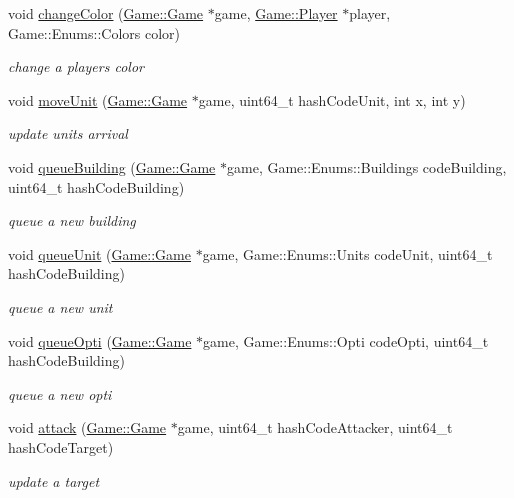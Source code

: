 \begin{DoxyCompactItemize}
void \hyperlink{class_server_side_abb0e2ff64068223f46dd66b323386a9d}{change\+Color} (\hyperlink{class_game_1_1_game}{Game\+::\+Game} $\ast$game, \hyperlink{class_game_1_1_player}{Game\+::\+Player} $\ast$player, Game\+::\+Enums\+::\+Colors color)
\begin{DoxyCompactList}\small\item\em change a player\textquotesingle{}s color \end{DoxyCompactList}\item 
void \hyperlink{class_server_side_a71bd6a7b163c6a8c23233832fd3bbb63}{move\+Unit} (\hyperlink{class_game_1_1_game}{Game\+::\+Game} $\ast$game, uint64\+\_\+t hash\+Code\+Unit, int x, int y)
\begin{DoxyCompactList}\small\item\em update unit\textquotesingle{}s arrival \end{DoxyCompactList}\item 
void \hyperlink{class_server_side_a294f328778629a8e499c5ac87ebbda9f}{queue\+Building} (\hyperlink{class_game_1_1_game}{Game\+::\+Game} $\ast$game, Game\+::\+Enums\+::\+Buildings code\+Building, uint64\+\_\+t hash\+Code\+Building)
\begin{DoxyCompactList}\small\item\em queue a new building \end{DoxyCompactList}\item 
void \hyperlink{class_server_side_ac24547f0638dc01d70dd2bd5ae4eb12c}{queue\+Unit} (\hyperlink{class_game_1_1_game}{Game\+::\+Game} $\ast$game, Game\+::\+Enums\+::\+Units code\+Unit, uint64\+\_\+t hash\+Code\+Building)
\begin{DoxyCompactList}\small\item\em queue a new unit \end{DoxyCompactList}\item 
void \hyperlink{class_server_side_aadcda55d93b27656d41548782e485049}{queue\+Opti} (\hyperlink{class_game_1_1_game}{Game\+::\+Game} $\ast$game, Game\+::\+Enums\+::\+Opti code\+Opti, uint64\+\_\+t hash\+Code\+Building)
\begin{DoxyCompactList}\small\item\em queue a new opti \end{DoxyCompactList}\item 
void \hyperlink{class_server_side_a0ad75fd24a1728a419b945bd2ad170fd}{attack} (\hyperlink{class_game_1_1_game}{Game\+::\+Game} $\ast$game, uint64\+\_\+t hash\+Code\+Attacker, uint64\+\_\+t hash\+Code\+Target)
\begin{DoxyCompactList}\small\item\em update a target \end{DoxyCompactList}\item 

\end{DoxyCompactItemize}
